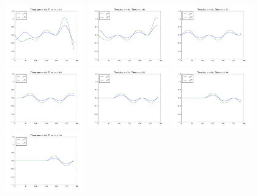 \documentclass{article} %
\theoremstyle{plain}
\numberwithin{equation}{section} %
\numberwithin{figure}{section} %
\numberwithin{table}{section} %
\begin{document}
\begin{enumerate}[\ \ (a)]
\begin{figure}[ht!]
            \includegraphics[width=0.31\textwidth]{figures/problem_1_c_040.png}
            \includegraphics[width=0.31\textwidth]{figures/problem_1_c_048.png}
            \includegraphics[width=0.31\textwidth]{figures/problem_1_c_056.png}
            \includegraphics[width=0.31\textwidth]{figures/problem_1_c_064.png}
            \includegraphics[width=0.31\textwidth]{figures/problem_1_c_072.png}
            \includegraphics[width=0.31\textwidth]{figures/problem_1_c_080.png}
            \includegraphics[width=0.31\textwidth]{figures/problem_1_c_088.png}

\end{figure}
\end{enumerate}
\end{document}

